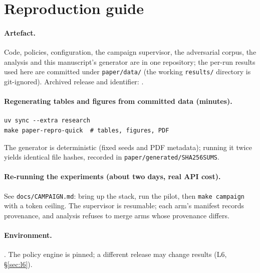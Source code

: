 \section{Reproduction guide}\label{app:repro}

\paragraph{Artefact.}
Code, policies, configuration, the campaign supervisor, the adversarial corpus, the analysis and this
manuscript's generator are in one repository; the per-run results used here are committed under
\texttt{paper/data/} (the working \texttt{results/} directory is git-ignored). Archived release and
identifier: .

\paragraph{Regenerating tables and figures from committed data (minutes).}
\begin{verbatim}
uv sync --extra research
make paper-repro-quick  # tables, figures, PDF
\end{verbatim}
The generator is deterministic (fixed seeds and PDF metadata); running it twice yields identical file
hashes, recorded in \texttt{paper/generated/SHA256SUMS}.

\paragraph{Re-running the experiments (about two days, real API cost).}
See \texttt{docs/CAMPAIGN.md}: bring up the stack, run the pilot, then \texttt{make campaign} with a
token ceiling. The supervisor is resumable; each arm's manifest records provenance, and analysis
refuses to merge arms whose provenance differs.

\paragraph{Environment.}
. The policy engine is pinned; a different release may change results
(L6, \S\ref{sec:l6}).
